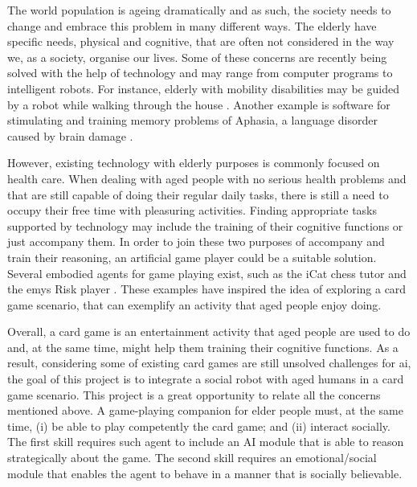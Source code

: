 \label{sec:introduction}

The world population is ageing dramatically and as such, the society needs to change and embrace this problem in many different ways. The elderly have specific needs, physical and cognitive, that are often not considered in the way we, as a society, organise our lives.
Some of these concerns are recently being solved with the help of technology and may range from computer programs to intelligent robots.
For instance, elderly with mobility disabilities may be guided by a robot while walking through the house \cite{Pollack2002}.
Another example is software for stimulating and training memory problems of Aphasia, a language disorder caused by brain damage \cite{Pompili2011}.

However, existing technology with elderly purposes is commonly focused on health care.
When dealing with aged people with no serious health problems and that are still capable of doing their regular daily tasks, there is still a need to occupy their free time with pleasuring activities.
Finding appropriate tasks supported by technology may include the training of their cognitive functions or just accompany them.
In order to join these two purposes of accompany and train their reasoning, an artificial game player could be a suitable solution.
Several embodied agents for game playing exist, such as the iCat chess tutor \cite{Affective2007} and the \ac{emys} Risk player \cite{Pereira}.%
These examples have inspired the idea of exploring a card game scenario, that can exemplify an activity that aged people enjoy doing.

Overall, a card game is an entertainment activity that aged people are used to do and, at the same time, might help them training their cognitive functions.
As a result, considering some of existing card games are still unsolved challenges for \ac{ai}, the goal of this project is to integrate a social robot with aged humans in a card game scenario.
This project is a great opportunity to relate all the concerns mentioned above.
A game-playing companion for elder people must, at the same time, (i) be able to play competently the card game; and (ii) interact socially. The first skill requires such agent to include an AI module that is able to reason strategically about the game. The second skill requires an emotional/social module that enables the agent to behave in a manner that is socially believable.


